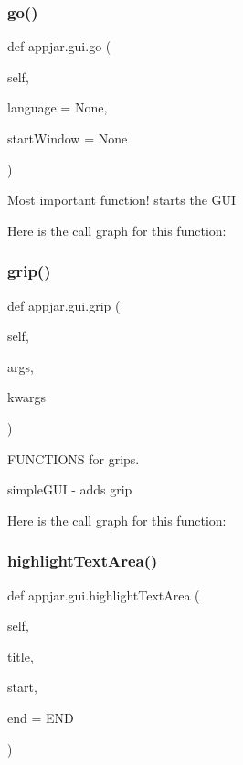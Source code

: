 \subsubsection{\texorpdfstring{go()}{go()}}
{\footnotesize\ttfamily def appjar.\+gui.\+go (\begin{DoxyParamCaption}\item[{}]{self,  }\item[{}]{language = {\ttfamily None},  }\item[{}]{start\+Window = {\ttfamily None} }\end{DoxyParamCaption})}

\begin{DoxyVerb}Most important function! starts the GUI \end{DoxyVerb}
 Here is the call graph for this function\+:
\mbox{\label{classappjar_1_1gui_a2f302320716e6b119316961e1c51f354}} 
\subsubsection{\texorpdfstring{grip()}{grip()}}
{\footnotesize\ttfamily def appjar.\+gui.\+grip (\begin{DoxyParamCaption}\item[{}]{self,  }\item[{}]{args,  }\item[{}]{kwargs }\end{DoxyParamCaption})}



F\+U\+N\+C\+T\+I\+O\+NS for grips. 

\begin{DoxyVerb}simpleGUI - adds grip \end{DoxyVerb}
 Here is the call graph for this function\+:
\mbox{\label{classappjar_1_1gui_ade6ea7df6fed5fec97ba454c5ff1c635}} 
\subsubsection{\texorpdfstring{highlight\+Text\+Area()}{highlightTextArea()}}
{\footnotesize\ttfamily def appjar.\+gui.\+highlight\+Text\+Area (\begin{DoxyParamCaption}\item[{}]{self,  }\item[{}]{title,  }\item[{}]{start,  }\item[{}]{end = {\ttfamily END} }\end{DoxyParamCaption})}

